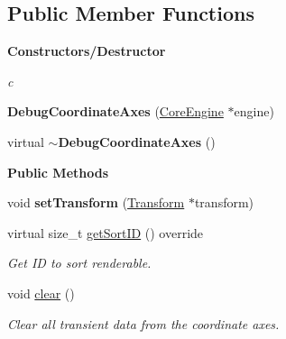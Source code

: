 \subsection*{Public Member Functions}
\begin{Indent}\textbf{ Constructors/\+Destructor}\par
{\em c }\begin{DoxyCompactItemize}
\item 
\mbox{\label{classrev_1_1_debug_coordinate_axes_ad7dd57bcde81c9d7b31b460fbfc46fae}} 
{\bfseries Debug\+Coordinate\+Axes} (\mbox{\hyperlink{classrev_1_1_core_engine}{Core\+Engine}} $\ast$engine)
\item 
\mbox{\label{classrev_1_1_debug_coordinate_axes_a7376f4e2ca9b9f7a87705967a45337c1}} 
virtual {\bfseries $\sim$\+Debug\+Coordinate\+Axes} ()
\end{DoxyCompactItemize}
\end{Indent}
\begin{Indent}\textbf{ Public Methods}\par
\begin{DoxyCompactItemize}
\item 
\mbox{\label{classrev_1_1_debug_coordinate_axes_a178fbdd8b308d409acabc84b689f2991}} 
void {\bfseries set\+Transform} (\mbox{\hyperlink{classrev_1_1_transform}{Transform}} $\ast$transform)
\item 
\mbox{\label{classrev_1_1_debug_coordinate_axes_ab531967fba544176568110b46cb2dfc9}} 
virtual size\+\_\+t \mbox{\hyperlink{classrev_1_1_debug_coordinate_axes_ab531967fba544176568110b46cb2dfc9}{get\+Sort\+ID}} () override
\begin{DoxyCompactList}\small\item\em Get ID to sort renderable. \end{DoxyCompactList}\item 
\mbox{\label{classrev_1_1_debug_coordinate_axes_ad95c4e4c2f72fc599840ed0242c5ad3e}} 
void \mbox{\hyperlink{classrev_1_1_debug_coordinate_axes_ad95c4e4c2f72fc599840ed0242c5ad3e}{clear}} ()
\begin{DoxyCompactList}\small\item\em Clear all transient data from the coordinate axes. \end{DoxyCompactList}\end{DoxyCompactItemize}
\end{Indent}
